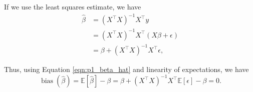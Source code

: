 \documentclass[letterpaper,11pt]{article}
\begin{document}
\begin{enumerate}
\begin{enumerate}
\begin{description}
      If we use the least squares estimate, we have
      \begin{align}
        \hat{\beta}
        &= \left(X^\intercal X\right)^{-1}X^\intercal y \nonumber\\
        &= \left(X^\intercal X\right)^{-1}X^\intercal\left(X\beta + \epsilon \right) \nonumber\\
        &= \beta + \left(X^\intercal X\right)^{-1}X^\intercal\epsilon,
          \label{eqn:p1_beta_hat}
      \end{align}

      Thus, using Equation \ref{eqn:p1_beta_hat} and linearity of expectations,
      we have
      \begin{equation}
        \boxed{
          \operatorname{bias}\left(\hat{\beta}\right) =
          \mathbb{E}\left[\hat{\beta}\right] - \beta =
          \beta +
          \left(X^\intercal X\right)^{-1}X^\intercal
          \mathbb{E}\left[\epsilon\right] - \beta
          = 0.
        }
        \label{eqn:p1_beta_hat_bias}
      \end{equation}
    \end{description}
  \end{enumerate}
\end{enumerate}
\end{document}
